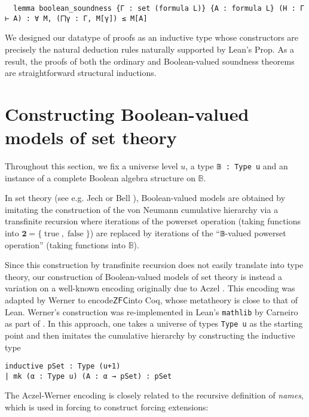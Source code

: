 \documentclass[a4paper,USenglish,cleveref, autoref]{lipics-v2019}
\newcommand{\B}{\mathbb{B}}
\theoremstyle{definition}
\begin{document}
\begin{lstlisting}
  lemma boolean_soundness {Γ : set (formula L)} {A : formula L} (H : Γ ⊢ A) : ∀ M, (⨅γ : Γ, M[γ]) ≤ M[A]
\end{lstlisting}

We designed our datatype of proofs as an inductive type whose constructors are precisely the natural deduction rules naturally supported by Lean's Prop. As a result, the proofs of both the ordinary and Boolean-valued soundness theorems are straightforward structural inductions.


\section{Constructing Boolean-valued models of set theory}
\label{sect:bvm}
Throughout this section, we fix a universe level $u$, a type \lstinline{𝔹 : Type u} and an instance of a complete Boolean algebra structure on $\B$.

In set theory (see e.g. Jech \cite{jech1} or Bell \cite{bell1}), Boolean-valued models are obtained by imitating the construction of the von Neumann cumulative hierarchy via a transfinite recursion where iterations of the powerset operation (taking functions into $\mathbf{2} = \{\operatorname{true}, \operatorname{false}\}$) are replaced by iterations of the ``\lstinline{𝔹}-valued powerset operation'' (taking functions into $\B$).

Since this construction by transfinite recursion does not easily translate into type theory, our construction of Boolean-valued models of set theory is instead a variation on a well-known encoding originally due to Aczel \cite{aczel1} \cite{aczel2} \cite{aczel3}. This encoding was adapted by Werner \cite{werner1} to encode$\mathsf{ZFC}$into Coq, whose metatheory is close to that of Lean. Werner's construction was re-implemented in Lean's \texttt{mathlib} by Carneiro as part of \cite{mario1}. In this approach, one takes a universe of types \texttt{Type u} as the starting point and then imitates the cumulative hierarchy by constructing the inductive type
\begin{lstlisting}
inductive pSet : Type (u+1)
| mk (α : Type u) (A : α → pSet) : pSet
\end{lstlisting}
The Aczel-Werner encoding is closely related to the recursive definition of \emph{names}, which is used in forcing to construct forcing extensions:
\end{document}
